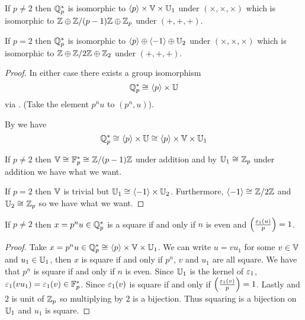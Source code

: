 \begin{prop}[Decomposition of $\Q_p^*$]
    If $p \ne 2$ then $\Q_p^*$ is isomorphic to 
    $\langle p\rangle \times \mathbb{V} \times \mathbb{U}_1$ under $(\times,\times,\times)$
    which is isomorphic to 
    $\mathbb{Z} \oplus \mathbb{Z} / (p - 1)\mathbb{Z} \oplus \mathbb{Z}_p$ under $(+,+,+)$.

    If $p = 2$ then $\Q_p^*$ is isomorphic to 
    $\langle p\rangle \oplus \langle-1\rangle \oplus \mathbb{U}_2$ under $(\times,\times,\times)$
    which is isomorphic to 
    $\mathbb{Z} \oplus \mathbb{Z} / 2\mathbb{Z} \oplus \mathbb{Z}_2$ under $(+,+,+)$.
\end{prop}
\begin{proof}
    In either case there exists a group isomorphism 
    \[\mathbb{Q}_p^* \cong_{} \langle p\rangle \times \mathbb{U}\]
    via .
    (Take the element $p^n u$ to $(p^n, u)$).
    
    By 
    we have
    \[\mathbb{Q}_p^* \cong_{} \langle p\rangle \times \mathbb{U} \cong_{} 
    \langle p\rangle \times \mathbb{V} \times \mathbb{U}_1\]

    If $p \ne 2$ then $\mathbb{V} \cong_{} \mathbb{F}_p^* \cong_{} \mathbb{Z} /(p-1)\mathbb{Z}$ 
    under addition and by
    $\mathbb{U}_1 \cong_{} \mathbb{Z}_p$ under addition we have what we want.

    If $p = 2$ then $\mathbb{V}$ is trivial but
    $\mathbb{U}_1 \cong_{} \langle-1\rangle \times \mathbb{U}_2$.
    Furthermore, 
    $\langle-1\rangle \cong_{} \mathbb{Z} / 2 \mathbb{Z}$ and
    $\mathbb{U}_2 \cong_{} \mathbb{Z}_p$ so we have what we want.
\end{proof}

\begin{prop}
    If $p \ne 2$ then $x = p^n u \in \mathbb{Q}_p^*$ 
    is a square if and only if
    $n$ is even and $\left(\frac{\varepsilon_1(u)}{p}\right) = 1$.
\end{prop}
\begin{proof}
    Take 
    $x = p^n u \in \mathbb{Q}_p^* \cong_{} \langle p\rangle \times \mathbb{V} \times \mathbb{U}_1$.
    We can write $u = v u_1$ for some 
    $v \in \mathbb{V}$ and $u_1 \in \mathbb{U}_1$, then
    $x$ is square if and only if $p^n$, 
    $v$ and $u_1$ are all square.
    We have that $p^n$ is square if and only if $n$ is even.
    Since $\mathbb{U}_1$ is the kernel of $\varepsilon_1$,
    $\varepsilon_1(v u_1) = \varepsilon_1(v) \in \mathbb{F}_p^*$.
    Since 
    $\varepsilon_1(v)$ is square if and only if $\left(\frac{\varepsilon_1(v)}{p}\right) = 1$.
    Lastly 
    and $2$ is unit of $\mathbb{Z}_p$ so multiplying by $2$ is a bijection.
    Thus squaring is a bijection on $\mathbb{U}_1$ and $u_1$ is square.
\end{proof}

